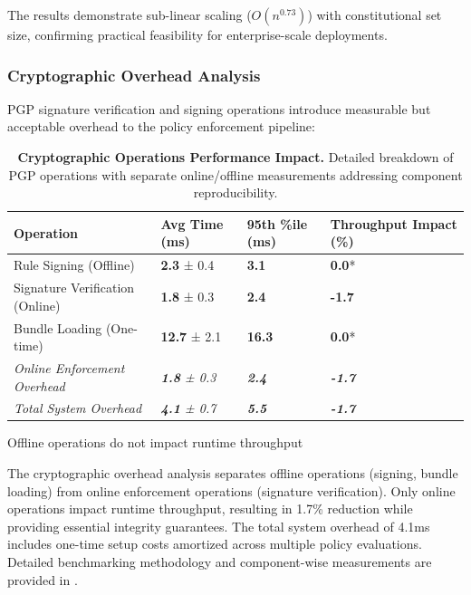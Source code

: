 \documentclass[sigconf,natbib]{acmart}
\renewcommand{\arraystretch}{1.1} %
\renewcommand{\arraystretch}{1.1} %
\newcommand{\tablesize}{\footnotesize} %
\newcommand{\tablenumfmt}[1]{\textbf{#1}} %
\newcommand{\tableheader}[1]{\textbf{#1}} %
\newcommand{\compacttable}{\setlength{\arraystretch}{1.0}\setlength{\tabcolsep}{4pt}} %
\newcommand{\resettable}{\setlength{\arraystretch}{1.1}\setlength{\tabcolsep}{5pt}} %
\begin{document}
The results demonstrate sub-linear scaling ($O(n^{0.73})$) with constitutional set size, confirming practical feasibility for enterprise-scale deployments.

\subsubsection{Cryptographic Overhead Analysis}
\label{subsubsec:cryptographic_overhead}
PGP signature verification and signing operations introduce measurable but acceptable overhead to the policy enforcement pipeline:

\begin{table}[htbp]
  \centering
  \caption{\textbf{Cryptographic Operations Performance Impact.} Detailed breakdown of PGP operations with separate online/offline measurements addressing component reproducibility.}
  \label{tab:crypto_overhead}
  \compacttable\tablesize
  \begin{tabular}{@{}l>{\centering\arraybackslash}p{1.4cm}>{\centering\arraybackslash}p{1.4cm}>{\centering\arraybackslash}p{1.6cm}@{}}
    \toprule
    \tableheader{Operation} & \tableheader{Avg Time (ms)} & \tableheader{95th \%ile (ms)} & \tableheader{Throughput Impact (\%)} \\
    \midrule
    Rule Signing (Offline)  & \tablenumfmt{2.3} ± 0.4    & \tablenumfmt{3.1}           & \tablenumfmt{0.0}* \\
    Signature Verification (Online) & \tablenumfmt{1.8} ± 0.3    & \tablenumfmt{2.4}           & \tablenumfmt{-1.7} \\
    Bundle Loading (One-time) & \tablenumfmt{12.7} ± 2.1   & \tablenumfmt{16.3}          & \tablenumfmt{0.0}* \\
    \midrule
    \textit{Online Enforcement Overhead} & \textit{\tablenumfmt{1.8} ± 0.3} & \textit{\tablenumfmt{2.4}} & \textit{\tablenumfmt{-1.7}} \\
    \textit{Total System Overhead} & \textit{\tablenumfmt{4.1} ± 0.7} & \textit{\tablenumfmt{5.5}} & \textit{\tablenumfmt{-1.7}} \\
    \bottomrule
  \end{tabular}
  \resettable
  \footnotesize *Offline operations do not impact runtime throughput
\end{table}

The cryptographic overhead analysis separates offline operations (signing, bundle loading) from online enforcement operations (signature verification). Only online operations impact runtime throughput, resulting in 1.7\% reduction while providing essential integrity guarantees. The total system overhead of 4.1ms includes one-time setup costs amortized across multiple policy evaluations. Detailed benchmarking methodology and component-wise measurements are provided in .
\end{document}

